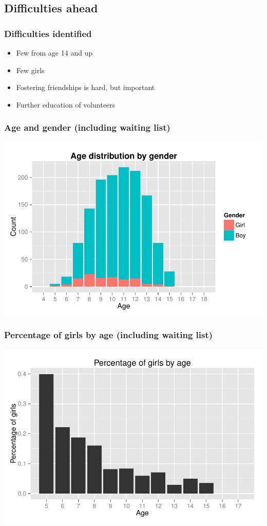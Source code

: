 \documentclass{beamer}
\begin{document}
\subsection{Difficulties ahead}
\begin{frame}
\frametitle{Difficulties identified}
\begin{itemize}
\item Few from age 14 and up
\item Few girls
\item Fostering friendships is hard, but important
\item Further education of volunteers
\end{itemize}
\end{frame}

\begin{frame}
  \frametitle{Age and gender (including waiting list)}
  \centerline{\includegraphics[width=\textwidth]{../datacrunching/age-gender-hist}}
\end{frame}

\begin{frame}
  \frametitle{Percentage of girls by age (including waiting list)}
  \centerline{\includegraphics[width=\textwidth]{../datacrunching/girl_percentage}}
\end{frame}
\end{document}
